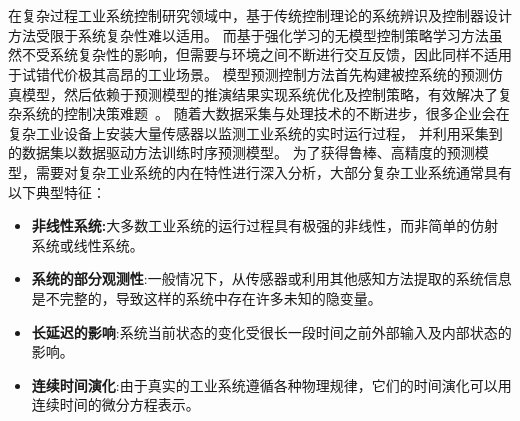 \renewcommand{\b}{\boldsymbol}

\chapter{\TitlechapterI}
在复杂过程工业系统控制研究领域中，基于传统控制理论的系统辨识及控制器设计方法受限于系统复杂性难以适用。
而基于强化学习的无模型控制策略学习方法虽然不受系统复杂性的影响，但需要与环境之间不断进行交互反馈，因此同样不适用于试错代价极其高昂的工业场景。
模型预测控制方法首先构建被控系统的预测仿真模型，然后依赖于预测模型的推演结果实现系统优化及控制策略，有效解决了复杂系统的控制决策难题~\cite{Yuan2020,Member2019,wu2020optimization}。
随着大数据采集与处理技术的不断进步，很多企业会在复杂工业设备上安装大量传感器以监测工业系统的实时运行过程，
并利用采集到的数据集以数据驱动方法训练时序预测模型\cite{larsson2002identification}。
为了获得鲁棒、高精度的预测模型，需要对复杂工业系统的内在特性进行深入分析，大部分复杂工业系统通常具有以下典型特征：
\begin{itemize}
\item \textbf{非线性系统:}大多数工业系统的运行过程具有极强的非线性，而非简单的仿射系统或线性系统。
\item \textbf{系统的部分观测性}:一般情况下，从传感器或利用其他感知方法提取的系统信息是不完整的，导致这样的系统中存在许多未知的隐变量。
\item \textbf{长延迟的影响}:系统当前状态的变化受很长一段时间之前外部输入及内部状态的影响。
\item \textbf{连续时间演化}:由于真实的工业系统遵循各种物理规律，它们的时间演化可以用连续时间的微分方程表示。
\end{itemize}

